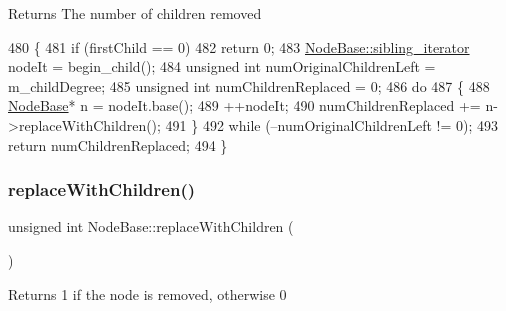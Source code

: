 \begin{DoxyReturn}{Returns}
The number of children removed 
\end{DoxyReturn}

\begin{DoxyCode}
480 \{
481     \textcolor{keywordflow}{if} (firstChild == 0)
482         \textcolor{keywordflow}{return} 0;
483     \mbox{\hyperlink{classSiblingIterator}{NodeBase::sibling\_iterator}} nodeIt = begin\_child();
484     \textcolor{keywordtype}{unsigned} \textcolor{keywordtype}{int} numOriginalChildrenLeft = m\_childDegree;
485     \textcolor{keywordtype}{unsigned} \textcolor{keywordtype}{int} numChildrenReplaced = 0;
486     \textcolor{keywordflow}{do}
487     \{
488         \mbox{\hyperlink{classNodeBase}{NodeBase}}* n = nodeIt.base();
489         ++nodeIt;
490         numChildrenReplaced += n->replaceWithChildren();
491     \}
492     \textcolor{keywordflow}{while} (--numOriginalChildrenLeft != 0);
493     \textcolor{keywordflow}{return} numChildrenReplaced;
494 \}
\end{DoxyCode}
\mbox{\label{classNodeBase_a8500451b00095013400f709cd4a333db}} 
\subsubsection{\texorpdfstring{replace\+With\+Children()}{replaceWithChildren()}}
{\footnotesize\ttfamily unsigned int Node\+Base\+::replace\+With\+Children (\begin{DoxyParamCaption}{ }\end{DoxyParamCaption})\hspace{0.3cm}{\ttfamily [inline]}}

\begin{DoxyReturn}{Returns}
1 if the node is removed, otherwise 0 
\end{DoxyReturn}


